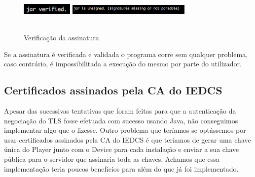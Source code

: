 \documentclass[pdftex,12pt,a4paper]{report}
\begin{document}
\begin{figure}[!htb]
\center
 \includegraphics[width=25mm,scale=1]{jarsigned.png}
 \includegraphics[width=60mm,scale=1]{jarunsigned.png}
 \caption{\\Verificação da assinatura}
 \label{fig:docker_c}
\end{figure}

Se a assinatura é verificada e validada o programa corre sem qualquer problema, caso contrário, é impossibilitada a execução do mesmo por parte do utilizador.

\subsection{Certificados assinados pela CA do IEDCS}
Apesar das sucessivas tentativas que foram feitas para que a autenticação da negociação do TLS fosse efetuada com sucesso usando Java, não conseguimos implementar algo que o fizesse. Outro problema que teríamos se optássemos por usar certificados assinados pela CA do IEDCS é que teríamos de gerar uma chave única do Player junto com o Device para cada instalação e enviar a sua chave pública para o servidor que assinaria toda as chaves. Achamos que essa implementação teria poucos benefícios para além do que já foi implementado.
\end{document}
